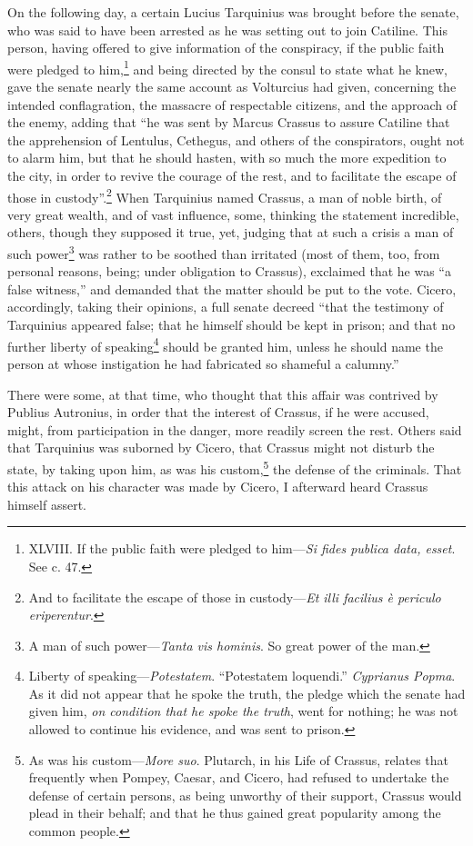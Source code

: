 On the following day, a certain Lucius Tarquinius was brought before
the senate, who was said to have been arrested as he was setting out
to join Catiline. This person, having offered to give information of
the conspiracy, if the public faith were pledged to him,\footnote{XLVIII. If the public faith were pledged to him—\emph{Si fides
publica data, esset}. See c. 47.} and
being directed by the consul to state what he knew, gave the senate
nearly the same account as Volturcius had given, concerning the
intended conflagration, the massacre of respectable citizens, and the
approach of the enemy, adding that ``he was sent by Marcus Crassus to
assure Catiline that the apprehension of Lentulus, Cethegus, and
others of the conspirators, ought not to alarm him, but that he should
hasten, with so much the more expedition to the city, in order to
revive the courage of the rest, and to facilitate the escape of those
in custody''.\footnote{And to facilitate the escape of those in custody—\emph{Et illi
facilius è periculo eriperentur}.} When Tarquinius named Crassus, a man of noble birth,
of very great wealth, and of vast influence, some, thinking the
statement incredible, others, though they supposed it true, yet,
judging that at such a crisis a man of such power\footnote{A man of such power—\emph{Tanta vis hominis}. So great power of
the man.} was rather to
be soothed than irritated (most of them, too, from personal reasons,
being; under obligation to Crassus), exclaimed that he was ``a false
witness,'' and demanded that the matter should be put to the vote.
Cicero, accordingly, taking their opinions, a full senate decreed
``that the testimony of Tarquinius appeared false; that he himself
should be kept in prison; and that no further liberty of speaking\footnote{Liberty of speaking—\emph{Potestatem}. ``Potestatem loquendi.''
\emph{Cyprianus Popma}. As it did not appear that he spoke the truth, the
pledge which the senate had given him, \emph{on condition that he spoke the
truth}, went for nothing; he was not allowed to continue his evidence,
and was sent to prison.}
should be granted him, unless he should name the person at whose
instigation he had fabricated so shameful a calumny.''

There were some, at that time, who thought that this affair was
contrived by Publius Autronius, in order that the interest of Crassus,
if he were accused, might, from participation in the danger, more
readily screen the rest. Others said that Tarquinius was suborned by
Cicero, that Crassus might not disturb the state, by taking upon him,
as was his custom,\footnote{As was his custom—\emph{More suo}. Plutarch, in his Life of Crassus,
relates that frequently when Pompey, Caesar, and Cicero, had refused
to undertake the defense of certain persons, as being unworthy of
their support, Crassus would plead in their behalf; and that he thus
gained great popularity among the common people.} the defense of the criminals. That this attack
on his character was made by Cicero, I afterward heard Crassus himself
assert.

